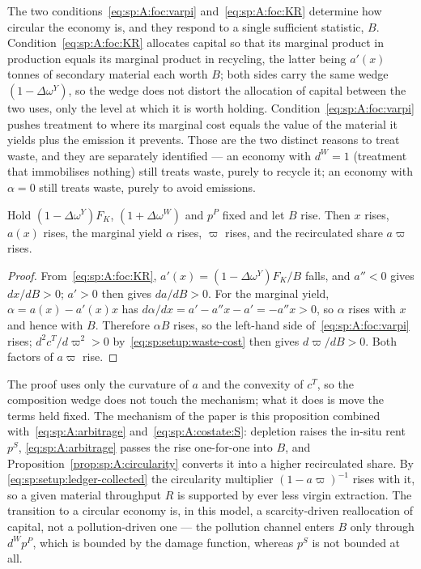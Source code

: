  The two conditions~\eqref{eq:sp:A:foc:varpi}
and~\eqref{eq:sp:A:foc:KR} determine how circular the economy is, and they respond to a single
sufficient statistic, $B$. Condition~\eqref{eq:sp:A:foc:KR} allocates capital so that its marginal
product in production equals its marginal product in recycling, the latter being $a'(x)$ tonnes of
secondary material each worth $B$; both sides carry the same wedge
$\left(1-\Delta\omega^Y\right)$, so the wedge does not distort the allocation of capital between the
two uses, only the level at which it is worth holding.
Condition~\eqref{eq:sp:A:foc:varpi} pushes treatment to where its marginal cost equals the value of
the material it yields plus the emission it prevents. Those are the two distinct reasons to treat
waste, and they are separately identified --- an economy with $d^W=1$ (treatment that immobilises
nothing) still treats waste, purely to recycle it; an economy with $\alpha=0$ still treats waste,
purely to avoid emissions.

\begin{proposition}\label{prop:sp:A:circularity}
Hold $\left(1-\Delta\omega^Y\right)F_K$, $\left(1+\Delta\omega^W\right)$ and $p^P$ fixed and let
$B$ rise. Then $x$ rises, $a(x)$ rises, the marginal yield $\alpha$ rises, $\varpi$ rises,
and the recirculated share $a\varpi$ rises.
\end{proposition}

\begin{proof}
From~\eqref{eq:sp:A:foc:KR}, $a'(x)=\left(1-\Delta\omega^Y\right)F_K/B$ falls, and $a''<0$
gives $dx/dB>0$; $a'>0$ then gives $da/dB>0$. For the marginal yield,
$\alpha=a(x)-a'(x)x$ has $d\alpha/dx=a'-a''x-a'=-a''x>0$, so $\alpha$ rises with $x$ and hence with
$B$. Therefore $\alpha B$ rises, so the left-hand side
of~\eqref{eq:sp:A:foc:varpi} rises; $d^2c^T/d\varpi^2>0$ by~\eqref{eq:sp:setup:waste-cost} then gives
$d\varpi/dB>0$. Both factors of $a\varpi$ rise.
\end{proof}

The proof uses only the curvature of $a$ and the convexity of $c^T$, so the composition wedge does
not touch the mechanism; what it does is move the terms held fixed. The mechanism of the paper is
this proposition combined with~\eqref{eq:sp:A:arbitrage} and~\eqref{eq:sp:A:costate:S}: depletion
raises the in-situ rent $p^S$, \eqref{eq:sp:A:arbitrage} passes the rise one-for-one into $B$, and
Proposition~\ref{prop:sp:A:circularity} converts it into a higher recirculated share. By
\eqref{eq:sp:setup:ledger-collected} the circularity multiplier $\left(1-a\varpi\right)^{-1}$ rises
with it, so a given material throughput $R$ is supported by ever less virgin extraction. The
transition to a circular economy is, in this model, a scarcity-driven reallocation of capital, not a
pollution-driven one --- the pollution channel enters $B$ only through $d^Wp^P$, which is bounded by
the damage function, whereas $p^S$ is not bounded at all.


